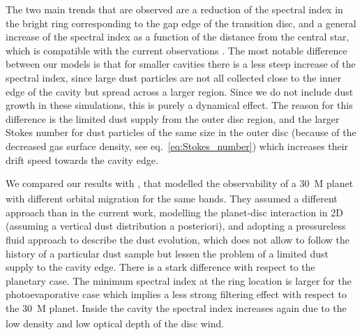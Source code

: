 \documentclass[fleqn,usenatbib]{mnras}
\begin{document}
    The two main trends that are observed are a reduction of the spectral index in the bright ring corresponding to the gap edge of the transition disc, and a general increase of the spectral index as a function of the distance from the central star, which is compatible with the current observations \citep[e.g.][]{Long2020}.
    The most notable difference between our models is that for smaller cavities there is a less steep increase of the spectral index, since large dust particles are not all collected close to the inner edge of the cavity but spread across a larger region.
    Since we do not include dust growth in these simulations, this is purely a dynamical effect. The reason for this difference is the limited dust supply from the outer disc region, and the larger Stokes number for dust particles of the same size in the outer disc (because of the decreased gas surface density, see eq.~\ref{eq:Stokes_number}) which increases their drift speed towards the cavity edge.

    We compared our results with \citet{Nazari_2019}, that modelled the observability of a \SI{30}{M_\oplus} planet with different orbital migration for the same bands.
    They assumed a different approach than in the current work, modelling the planet-disc interaction in 2D (assuming a vertical dust distribution a posteriori), and adopting a pressureless fluid approach to describe the dust evolution, which does not allow to follow the history of a particular dust sample but lessen the problem of a limited dust supply to the cavity edge.
    There is a stark difference with respect to the planetary case. 
    The minimum spectral index at the ring location is larger for the photoevaporative case which implies a less strong filtering effect with respect to the \SI{30}{M_\oplus} planet. 
    Inside the cavity the spectral index increases again due to the low density and low optical depth of the disc wind.%
\end{document}
